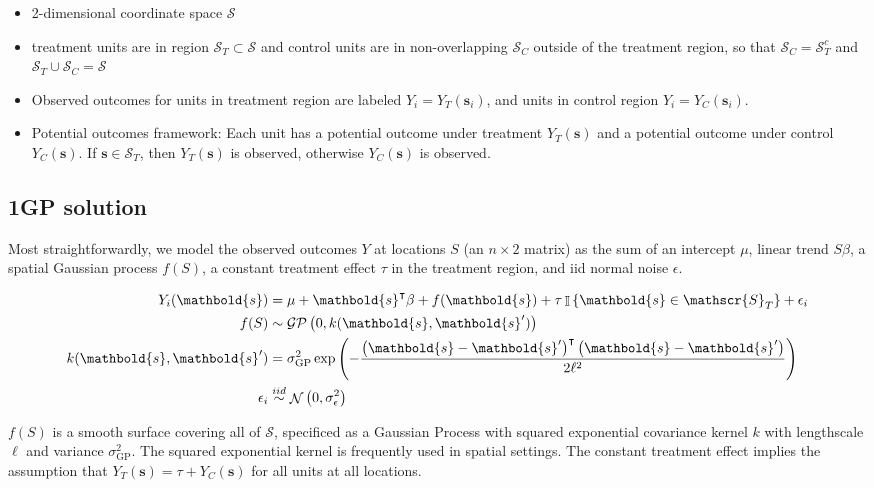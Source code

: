 \documentclass[letter]{article}
\providecommand{\tightlist}{%
      \setlength{\itemsep}{0pt}\setlength{\parskip}{0pt}}
\newcommand{\genericdel}[3]{%
      \left#1#3\right#2
    }
\newcommand{\del}[1]{\genericdel(){#1}}
\newcommand{\cbr}[1]{\genericdel\{\}{#1}}
\DeclareMathOperator{\Ind}{\mathbb{I}}
\DeclareMathOperator{\normal}{\mathcal{N}}
\newcommand{\gp}{\mathcal{GP}}
\newcommand{\trans}{^{\intercal}}
\newcommand{\scrS}{\mathscr{S}}
\newcommand{\sigmaf}{\sigma_{\mathrm{GP}}}
\newcommand{\svec}{\mathbold{s}}
\newcommand{\iid}{iid}
\providecommand{\tightlist}{%
  	  \setlength{\itemsep}{0pt}\setlength{\parskip}{0pt}}
\begin{document}
\begin{itemize}
\tightlist
\item
  2-dimensional coordinate space \(\scrS\)
\item
  treatment units are in region \(\scrS_T \subset \scrS\) and control
  units are in non-overlapping \(\scrS_C\) outside of the treatment
  region, so that \(\scrS_C = \scrS_T^c\) and
  \(\scrS_T \cup \scrS_C = \scrS\)
\item
  Observed outcomes for units in treatment region are labeled
  \(Y_i = Y_T(\svec_i)\), and units in control region
  \(Y_i = Y_C(\svec_i)\).
\item
  Potential outcomes framework: Each unit has a potential outcome under
  treatment \(Y_T(\svec)\) and a potential outcome under control
  \(Y_C(\svec)\). If \(\svec \in \scrS_T\), then \(Y_T(\svec)\) is
  observed, otherwise \(Y_C(\svec)\) is observed.
\end{itemize}

\subsection{1GP solution}\label{gp-solution}

Most straightforwardly, we model the observed outcomes \(Y\) at
locations \(S\) (an \(n \times 2\) matrix) as the sum of an intercept
\(\mu\), linear trend \(S\beta\), a spatial Gaussian process \(f(S)\), a
constant treatment effect \(\tau\) in the treatment region, and iid
normal noise \(\epsilon\).

\begin{equation}\begin{split}
Y_i(\svec) &= \mu+\svec\trans\beta + f(\svec) + \tau \Ind\cbr{\svec \in \scrS_T} + \epsilon_i \\
f(S) &\sim \gp\del{0, k(\svec, \svec')} \\
k(\svec,\svec') &= \sigmaf^2 \exp\del{ - \frac{\del{\svec-\svec'}\trans\del{\svec-\svec'}}{2 \ell^2}} \\
\epsilon_i &\overset{\iid}{\sim} \normal\del{0,\sigma_\epsilon^2}
\end{split}\end{equation}

\(f(S)\) is a smooth surface covering all of \(\scrS\), specificed as a
Gaussian Process with squared exponential covariance kernel \(k\) with
lengthscale \(\ell\) and variance \(\sigmaf^2\). The squared exponential
kernel is frequently used in spatial settings. The constant treatment
effect implies the assumption that \(Y_T(\svec) = \tau + Y_C(\svec)\)
for all units at all locations.
    
\end{document}
